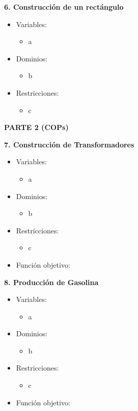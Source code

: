 \documentclass[12pt]{article}
\begin{document}
\newpage

\begin{flushleft}
\textbf{6. Construcción de un rectángulo}
\end{flushleft}

\begin{itemize}
\item Variables:
\begin{itemize}
\item a
\end{itemize}
\item Dominios:
\begin{itemize}
\item b
\end{itemize}
\item Restricciones:
\begin{itemize}
\item c
\end{itemize}
\end{itemize}

\newpage

\begin{center}
\large
\textbf{PARTE 2 (COPs)}
\end{center}

\begin{flushleft}
\textbf{7. Construcción de Transformadores}
\end{flushleft}

\begin{itemize}
\item Variables:
\begin{itemize}
\item a
\end{itemize}
\item Dominios:
\begin{itemize}
\item b
\end{itemize}
\item Restricciones:
\begin{itemize}
\item c
\end{itemize}
\item Función objetivo:
\end{itemize}

\newpage

\begin{flushleft}
\textbf{8. Producción de Gasolina}
\end{flushleft}

\begin{itemize}
\item Variables:
\begin{itemize}
\item a
\end{itemize}
\item Dominios:
\begin{itemize}
\item b
\end{itemize}
\item Restricciones:
\begin{itemize}
\item c
\end{itemize}
\item Función objetivo:
\end{itemize}
\end{document}
